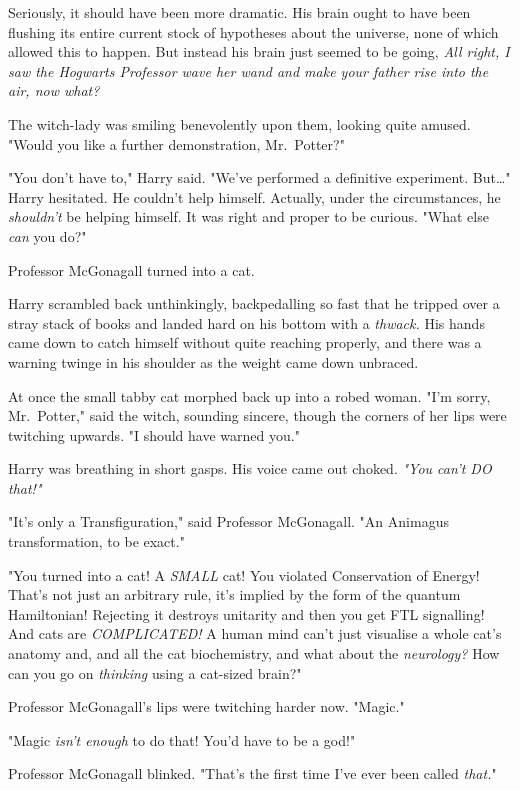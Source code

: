 Seriously, it should have been more dramatic. His brain ought to have been 
flushing its entire current stock of hypotheses about the universe, none of 
which allowed this to happen. But instead his brain just seemed to be going, 
\emph{All right, I saw the Hogwarts Professor wave her wand and make your 
father rise into the air, now what?}

The witch-lady was smiling benevolently upon them, looking quite amused. "Would 
you like a further demonstration, Mr.~Potter?"

"You don't have to," Harry said. "We've performed a definitive experiment. 
But{\ldots}" Harry hesitated. He couldn't help himself. Actually, under the 
circumstances, he \emph{shouldn't} be helping himself. It was right and proper 
to be curious. "What else \emph{can} you do?"

Professor McGonagall turned into a cat.

Harry scrambled back unthinkingly, backpedalling so fast that he tripped over a 
stray stack of books and landed hard on his bottom with a \emph{thwack.} His 
hands came down to catch himself without quite reaching properly, and there was 
a warning twinge in his shoulder as the weight came down unbraced.

At once the small tabby cat morphed back up into a robed woman. "I'm sorry, 
Mr.~Potter," said the witch, sounding sincere, though the corners of her lips 
were twitching upwards. "I should have warned you."

Harry was breathing in short gasps. His voice came out choked. \emph{"You can't 
DO that!"}

"It's only a Transfiguration," said Professor McGonagall. "An Animagus 
transformation, to be exact."

"You turned into a cat! A \emph{SMALL} cat! You violated Conservation of 
Energy! That's not just an arbitrary rule, it's implied by the form of the 
quantum Hamiltonian! Rejecting it destroys unitarity and then you get FTL 
signalling! And cats are \emph{COMPLICATED!} A human mind can't just visualise 
a whole cat's anatomy and, and all the cat biochemistry, and what about the 
\emph{neurology?} How can you go on \emph{thinking} using a cat-sized brain?"

Professor McGonagall's lips were twitching harder now. "Magic."

"Magic \emph{isn't enough} to do that! You'd have to be a god!"

Professor McGonagall blinked. "That's the first time I've ever been called 
\emph{that.}"

